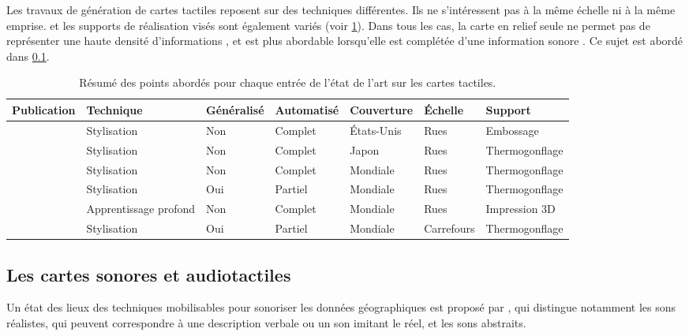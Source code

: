 Les travaux de génération de cartes tactiles reposent sur des techniques différentes. Ils ne s'intéressent pas à la même échelle ni à la même emprise. et les supports de réalisation visés sont également variés (voir \ref{tab:ea_relief}). Dans tous les cas, la carte en relief seule ne permet pas de représenter une haute densité d'informations \cite{Touya2019}, et est plus abordable lorsqu'elle est complétée d'une information sonore \cite{Brock2015}. Ce sujet est abordé dans \ref{ea_cartessonores}.


\begin{table}
\begin{center}
\scriptsize
\begin{tabular}{ | l | l | l | l | l | l | l | }
    Publication & Technique & Généralisé & Automatisé & Couverture & Échelle & Support \tabularnewline
    \hline
    \cite{Miele2004} & Stylisation & Non & Complet & États-Unis & Rues & Embossage \tabularnewline
    \cite{Minatani2010} & Stylisation & Non & Complet & Japon & Rues & Thermogonflage \tabularnewline
    \cite{Watanabe2014, Cervenka2016} & Stylisation & Non & Complet & Mondiale & Rues & Thermogonflage \tabularnewline
    \cite{Stampach2016} & Stylisation & Oui & Partiel & Mondiale & Rues & Thermogonflage \tabularnewline
    \cite{FillieresRiveau2020} & Apprentissage profond & Non & Complet & Mondiale & Rues & Impression 3D \tabularnewline
    \cite{Jiang2023} & Stylisation & Oui & Partiel & Mondiale & Carrefours & Thermogonflage \tabularnewline
\end{tabular}
\end{center}
\caption{Résumé des points abordés pour chaque entrée de l'état de l'art sur les cartes tactiles.}
\label{tab:ea_relief}
\end{table}


\label{ea_cartetactile}

\subsection{Les cartes sonores et audiotactiles}

\label{ea_cartessonores}

Un état des lieux des techniques mobilisables pour sonoriser les données géographiques est proposé par \cite{Krygier1994}, qui distingue notamment les sons réalistes, qui peuvent correspondre à une description verbale ou un son imitant le réel, et les sons abstraits.


